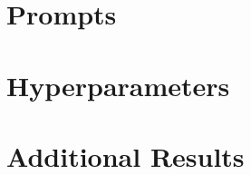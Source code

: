 \section{Prompts}
\label{app:prompts}

\section{Hyperparameters}
\label{app:hyperparameters}

\section{Additional Results}
\label{app:results}
